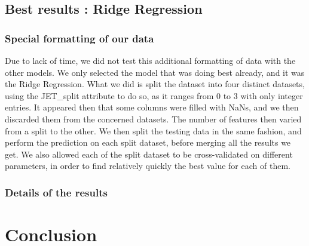 \documentclass[10pt,conference,compsocconf]{IEEEtran}
\begin{document}
\subsection{Best results : Ridge Regression}
\subsubsection{Special formatting of our data}
Due to lack of time, we did not test this additional formatting of data with the other models. We only selected the model that was doing best already, and it was the Ridge Regression. What we did is split the dataset into four distinct datasets, using the JET\_split attribute to do so, as it ranges from $0$ to $3$ with only integer entries. It appeared then that some columns were filled with NaNs, and we then discarded them from the concerned datasets. The number of features then varied from a split to the other. We then split the testing data in the same fashion, and perform the prediction on each split dataset, before merging all the results we get. We also allowed each of the split dataset to be cross-validated on different parameters, in order to find relatively quickly the best value for each of them.
\subsubsection{Details of the results}
\section{Conclusion}
\end{document}
